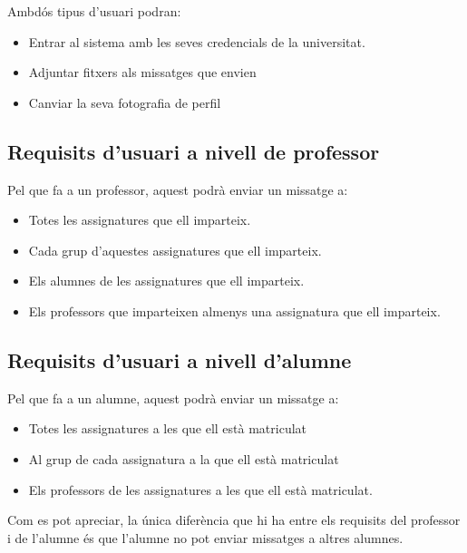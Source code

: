 Ambdós tipus d'usuari podran:
\begin{itemize}
	\item Entrar al sistema amb les seves credencials de la universitat. 
	\item Adjuntar fitxers als missatges que envien
	\item Canviar la seva fotografia de perfil
\end{itemize}

\subsection{Requisits d'usuari a nivell de professor}
Pel que fa a un professor, aquest podrà enviar un missatge a:
\begin{itemize}
	\item Totes les assignatures que ell imparteix.
	\item Cada grup d'aquestes assignatures que ell imparteix.
	\item Els alumnes de les assignatures que ell imparteix.
	\item Els professors que imparteixen almenys una assignatura que ell imparteix.
\end{itemize}

\subsection{Requisits d'usuari a nivell d'alumne}
Pel que fa a un alumne, aquest podrà enviar un missatge a:
\begin{itemize}
	\item Totes les assignatures a les que ell està matriculat
	\item Al grup de cada assignatura a la que ell està matriculat
	\item Els professors de les assignatures a les que ell està matriculat.
\end{itemize}

Com es pot apreciar, la única diferència que hi ha entre els requisits del professor i de l'alumne és que l'alumne no pot enviar missatges a altres alumnes.

